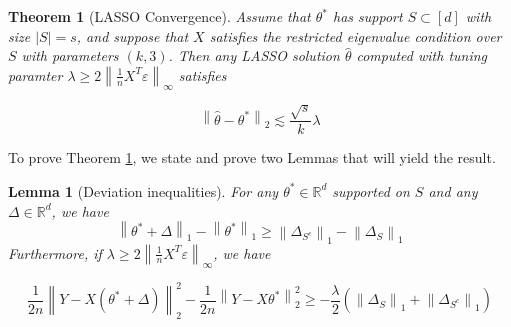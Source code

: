 \documentclass{article}
\newcommand{\R}{\mathbb{R}}
\newcommand{\norm}[1]{\left\|#1\right\|}
\newcommand{\eps}{\varepsilon} %
\newtheorem{theorem}{Theorem}
\newtheorem{lemma}{Lemma}
\begin{document}
\begin{theorem}[LASSO Convergence]\label{thm:lasso-conv}
  Assume that $\theta^{*}$ has support $S \subset [d]$ with size $|S| = s$, and suppose that $X$ satisfies the restricted eigenvalue condition over $S$ with parameters $(k, 3)$. Then any LASSO solution $\hat{\theta}$ computed with tuning paramter $\lambda \geq 2\norm{\frac1n X^{T}\eps}_{\infty}$ satisfies

  $$\norm{\hat{\theta} - \theta^{*}}_{2} \lesssim \frac{\sqrt{s}}{k}\lambda$$
\end{theorem}

To prove Theorem \ref{thm:lasso-conv}, we state and prove two Lemmas that will yield the result.

\begin{lemma}[Deviation inequalities]\label{lemma:dev-ineq-lasso}
	For any $\theta^{*} \in \R^{d}$ supported on $S$ and any $\Delta \in \R^{d}$, we have
	$$\norm{\theta^{*} + \Delta}_{1} - \norm{\theta^{*}}_{1} \geq \norm{\Delta_{S^{c}}}_{1} - \norm{\Delta_{S}}_{1}$$
	Furthermore, if $\lambda \geq 2\norm{\frac1n X^{T}\eps}_{\infty}$, we have

	$$\frac{1}{2n}\norm{Y - X(\theta^{*} + \Delta)}_{2}^{2} - \frac{1}{2n}\norm{Y - X\theta^{*}}_{2}^{2} \geq -\frac{\lambda}{2}\left(\norm{\Delta_{S}}_{1} + \norm{\Delta_{S^{c}}}_{1}\right)$$
\end{lemma}
\end{document}
